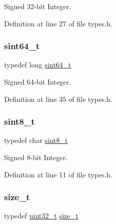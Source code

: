 Signed 32-\/bit Integer. 



Definition at line 27 of file types.\+h.

\mbox{\label{a00104_a04761b9e7480e1e48b0d392da17fd5d4_a04761b9e7480e1e48b0d392da17fd5d4}} 
\subsubsection{\texorpdfstring{sint64\+\_\+t}{sint64\_t}}
{\footnotesize\ttfamily typedef long \hyperlink{a00104_a04761b9e7480e1e48b0d392da17fd5d4_a04761b9e7480e1e48b0d392da17fd5d4}{sint64\+\_\+t}}



Signed 64-\/bit Integer. 



Definition at line 35 of file types.\+h.

\mbox{\label{a00104_afa23178c4119f09bd4562a86b501f444_afa23178c4119f09bd4562a86b501f444}} 
\subsubsection{\texorpdfstring{sint8\+\_\+t}{sint8\_t}}
{\footnotesize\ttfamily typedef char \hyperlink{a00104_afa23178c4119f09bd4562a86b501f444_afa23178c4119f09bd4562a86b501f444}{sint8\+\_\+t}}



Signed 8-\/bit Integer. 



Definition at line 11 of file types.\+h.

\mbox{\label{a00104_a29d85914ddff32967d85ada69854206d_a29d85914ddff32967d85ada69854206d}} 
\subsubsection{\texorpdfstring{size\+\_\+t}{size\_t}}
{\footnotesize\ttfamily typedef \hyperlink{a00104_a435d1572bf3f880d55459d9805097f62_a435d1572bf3f880d55459d9805097f62}{uint32\+\_\+t} \hyperlink{a00104_a29d85914ddff32967d85ada69854206d_a29d85914ddff32967d85ada69854206d}{size\+\_\+t}}



